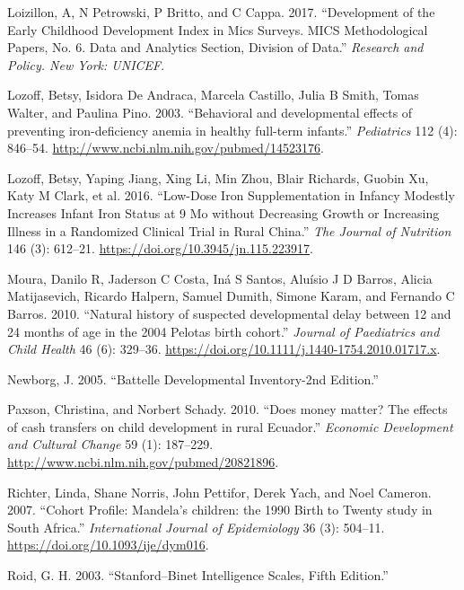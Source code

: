 \documentclass[
]{book}
\begin{document}
\leavevmode\hypertarget{ref-loizillon2017}{}%
Loizillon, A, N Petrowski, P Britto, and C Cappa. 2017. ``Development of the Early Childhood Development Index in Mics Surveys. MICS Methodological Papers, No. 6. Data and Analytics Section, Division of Data.'' \emph{Research and Policy. New York: UNICEF}.

\leavevmode\hypertarget{ref-Lozoff2003}{}%
Lozoff, Betsy, Isidora De Andraca, Marcela Castillo, Julia B Smith, Tomas Walter, and Paulina Pino. 2003. ``Behavioral and developmental effects of preventing iron-deficiency anemia in healthy full-term infants.'' \emph{Pediatrics} 112 (4): 846--54. \url{http://www.ncbi.nlm.nih.gov/pubmed/14523176}.

\leavevmode\hypertarget{ref-Lozoff2016}{}%
Lozoff, Betsy, Yaping Jiang, Xing Li, Min Zhou, Blair Richards, Guobin Xu, Katy M Clark, et al. 2016. ``Low-Dose Iron Supplementation in Infancy Modestly Increases Infant Iron Status at 9 Mo without Decreasing Growth or Increasing Illness in a Randomized Clinical Trial in Rural China.'' \emph{The Journal of Nutrition} 146 (3): 612--21. \url{https://doi.org/10.3945/jn.115.223917}.

\leavevmode\hypertarget{ref-Moura2010}{}%
Moura, Danilo R, Jaderson C Costa, Iná S Santos, Aluísio J D Barros, Alicia Matijasevich, Ricardo Halpern, Samuel Dumith, Simone Karam, and Fernando C Barros. 2010. ``Natural history of suspected developmental delay between 12 and 24 months of age in the 2004 Pelotas birth cohort.'' \emph{Journal of Paediatrics and Child Health} 46 (6): 329--36. \url{https://doi.org/10.1111/j.1440-1754.2010.01717.x}.

\leavevmode\hypertarget{ref-newborg2005}{}%
Newborg, J. 2005. ``Battelle Developmental Inventory-2nd Edition.''

\leavevmode\hypertarget{ref-Paxson2010}{}%
Paxson, Christina, and Norbert Schady. 2010. ``Does money matter? The effects of cash transfers on child development in rural Ecuador.'' \emph{Economic Development and Cultural Change} 59 (1): 187--229. \url{http://www.ncbi.nlm.nih.gov/pubmed/20821896}.

\leavevmode\hypertarget{ref-Richter2007}{}%
Richter, Linda, Shane Norris, John Pettifor, Derek Yach, and Noel Cameron. 2007. ``Cohort Profile: Mandela's children: the 1990 Birth to Twenty study in South Africa.'' \emph{International Journal of Epidemiology} 36 (3): 504--11. \url{https://doi.org/10.1093/ije/dym016}.

\leavevmode\hypertarget{ref-roid2003}{}%
Roid, G. H. 2003. ``Stanford--Binet Intelligence Scales, Fifth Edition.''
\end{document}
